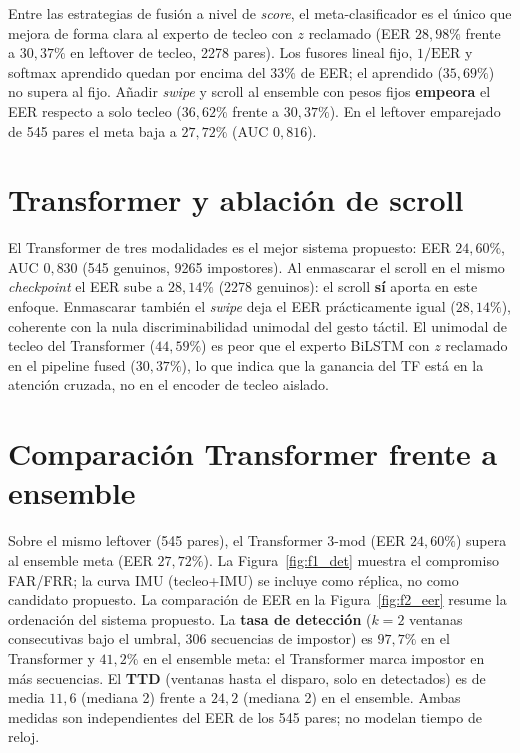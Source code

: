 Entre las estrategias de fusión a nivel de \textit{score}, el meta-clasificador es el único que mejora 
de forma clara al experto de tecleo con $z$ reclamado (EER $28{,}98\%$ frente a $30{,}37\%$ en leftover
de tecleo, 2278 pares). Los fusores lineal fijo, $1/\mathrm{EER}$ y softmax aprendido quedan por encima
del $33\%$ de EER; el aprendido ($35{,}69\%$) no supera al fijo. Añadir \textit{swipe} y scroll al ensemble
con pesos fijos \textbf{empeora} el EER respecto a solo tecleo ($36{,}62\%$ frente a $30{,}37\%$). En el
leftover emparejado de 545 pares el meta baja a $27{,}72\%$ (AUC $0{,}816$).

\section{Transformer y ablación de scroll}

El Transformer de tres modalidades es el mejor sistema propuesto: EER $24{,}60\%$, AUC $0{,}830$ 
(545 genuinos, 9265 impostores). Al enmascarar el scroll en el mismo \textit{checkpoint} el EER sube a 
$28{,}14\%$ (2278 genuinos): el scroll \textbf{sí} aporta en este enfoque. Enmascarar también el \textit{swipe}
deja el EER prácticamente igual ($28{,}14\%$), coherente con la nula discriminabilidad unimodal del 
gesto táctil. El unimodal de tecleo del Transformer ($44{,}59\%$) es peor que el experto BiLSTM con 
$z$ reclamado en el pipeline fused ($30{,}37\%$), lo que indica que la ganancia del TF está en la 
atención cruzada, no en el encoder de tecleo aislado.

\section{Comparación Transformer frente a ensemble}

Sobre el mismo leftover (545 pares), el Transformer 3-mod (EER $24{,}60\%$) supera al ensemble meta
(EER $27{,}72\%$). La Figura~\ref{fig:f1_det} muestra el compromiso FAR/FRR; la curva IMU (tecleo+IMU)
se incluye como réplica, no como candidato propuesto. La comparación de EER en la Figura~\ref{fig:f2_eer}
resume la ordenación del sistema propuesto.
La \textbf{tasa de detección} ($k=2$ ventanas consecutivas bajo el umbral, 306 secuencias de impostor)
es $97{,}7\%$ en el Transformer y $41{,}2\%$ en el ensemble meta: el Transformer marca impostor en más
secuencias. El \textbf{TTD} (ventanas hasta el disparo, solo en detectados) es de media $11{,}6$
(mediana 2) frente a $24{,}2$ (mediana 2) en el ensemble. Ambas medidas son independientes del EER de
los 545 pares; no modelan tiempo de reloj.

